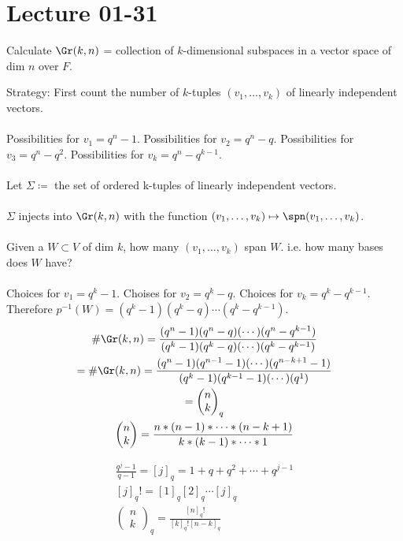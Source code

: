 \documentclass[class=scrartcl, crop=false]{standalone}
\date{2020-01-31}
\begin{document}
\section{Lecture 01-31}

Calculate $\Gr(k, n)$ = collection of $k$-dimensional subspaces in a vector space of dim $n$ over $F$.

Strategy: First count the number of $k$-tuples $(v_1, \dots, v_k)$ of linearly independent vectors.
\\\\
Possibilities for $v_1 = q^n - 1$. Possibilities for $v_2 = q^n - q$. Possibilities for $v_3 = q^n - q^2$. Possibilities for $v_k = q^n - q^{k - 1}$.
\\\\
Let $\Sigma \coloneqq$ the set of ordered k-tuples of linearly independent vectors.
\\\\
$\Sigma$ injects into  $\Gr(k, n)$ with the function $(v_1, \dots, v_k) \mapsto \spn(v_1, \dots, v_k)$.
\\\\
Given a $W \subset V$ of dim $k$, how many $(v_1, \dots, v_k)$ span $W$. i.e. how many bases does $W$ have?
\\\\
Choices for $v_1 = q^k - 1$. Choises for $v_2 = q^k - q$. Choices for $v_k = q^k - q^{k - 1}$. Therefore $p^{-1}(W) = (q^k - 1)(q^k - q)\cdots(q^k - q^{k - 1})$.
\begin{gather*}
  \#\Gr(k, n) = \frac{(q^n - 1)(q^n - q)(\cdots)(q^n - q^{k - 1})}{(q^k - 1)(q^k - q)(\cdots)(q^k - q^{k - 1})} \\
  = \#\Gr(k, n) = \frac{(q^n - 1)(q^{n - 1} - 1)(\cdots)(q^{n - k + 1} - 1)}{(q^k - 1)(q^{k - 1} - 1)(\cdots)(q^1)} \\
  =
  \begin{pmatrix}
    n \\ k
  \end{pmatrix}_q
  \\
  \begin{pmatrix}
    n \\ k
  \end{pmatrix} 
  = \frac{n * (n - 1) * \cdots * (n - k + 1)}{k * (k - 1) * \cdots * 1}
\end{gather*} 
\begin{note}
  \begin{gather*}
    \frac{q^j - 1}{q - 1} = [j]_q = 1 + q + q^2 + \cdots + q^{j - 1} \\
    [j]_q! = [1]_q[2]_q\cdots[j]_q \\
    \begin{pmatrix}
      n \\ k
    \end{pmatrix}_q
    = \frac{[n]_q!}{[k]_q![n - k]_q}
  \end{gather*} 
\end{note} 
\end{document}
